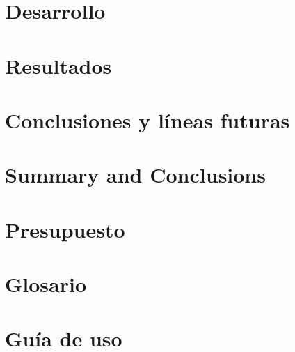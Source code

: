 \documentclass[spanish,a4paper,14pt,oneside]{extreport}
\begin{document}



\chapter{Desarrollo}
\label{chapter:dos}



\newpage{\pagestyle{empty}}
\thispagestyle{empty}

\chapter{Resultados}
\label{chapter:tres}



\newpage{\pagestyle{empty}}
\thispagestyle{empty}

\chapter{Conclusiones y líneas futuras}
\label{chapter:Conclusiones}



\newpage{\pagestyle{empty}}
\thispagestyle{empty}

\chapter{Summary and Conclusions }
\label{chapter:ingles}



\newpage{\pagestyle{empty}}
\thispagestyle{empty}

\chapter{Presupuesto}
\label{chapter:presupuesto}



\newpage{\pagestyle{empty}}
\thispagestyle{empty}
\begin{appendix}

\chapter{Glosario}
\label{appendix:1}


\chapter{Guía de uso}
\label{appendix:2}


\end{appendix}
\end{document}
